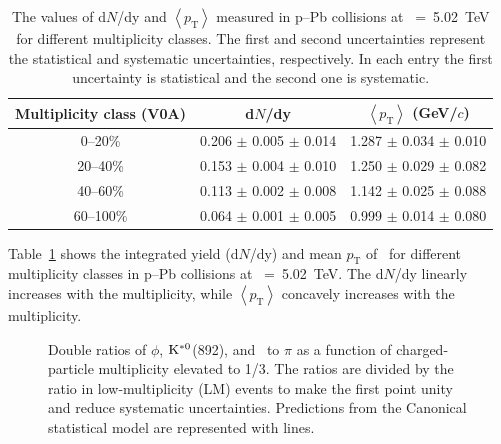 \begin{table}[h!]
\caption{The values of d$N$/dy and $\left\langle p_{\mathrm{T}} \right\rangle$ measured in p--Pb collisions at \snn~=~5.02~TeV for different multiplicity classes. The first and second uncertainties represent the statistical and systematic uncertainties, respectively. In each entry the first uncertainty is statistical and the second one is systematic. }
\centering
\begin{tabular}{ccc}
\hline 
Multiplicity class (V0A) & d$N$/dy & $\left\langle p_{\mathrm{T}} \right\rangle$ (GeV/$c$) \\ \hline
0--20\% & 0.206 $\pm$ 0.005 $\pm$ 0.014 & 1.287 $\pm$ 0.034 $\pm$ 0.010 \\
20--40\% & 0.153 $\pm$ 0.004 $\pm$ 0.010 & 1.250 $\pm$ 0.029 $\pm$ 0.082 \\
40--60\% & 0.113 $\pm$ 0.002 $\pm$ 0.008 & 1.142 $\pm$ 0.025 $\pm$ 0.088 \\
60--100\% & 0.064 $\pm$ 0.001 $\pm$ 0.005 & 0.999 $\pm$ 0.014 $\pm$ 0.080 \\
\hline
\end{tabular}
\label{tab:ymp}
\end{table}

Table~\ref{tab:ymp} shows the integrated yield (d$N$/dy) and mean $p_{\mathrm{T}}$ of \fzero~for different multiplicity classes in p--Pb collisions at \snn~=~5.02~TeV. The d$N$/dy linearly increases with the multiplicity, while $\left\langle p_{\mathrm{T}} \right\rangle$ concavely increases with the multiplicity. 

\begin{figure}[!hbt]
	\centering
	\caption{ Double ratios of $\phi$, $\rm{}K^{*0}$(892), and \fzero~to $\pi$ as a function of charged-particle multiplicity elevated to 1/3. The ratios are divided by the ratio in low-multiplicity (LM) events to make the first point unity and reduce systematic uncertainties. Predictions from the Canonical statistical model are represented with lines. }
	\label{fig:f0piAddCSM}
\end{figure}

